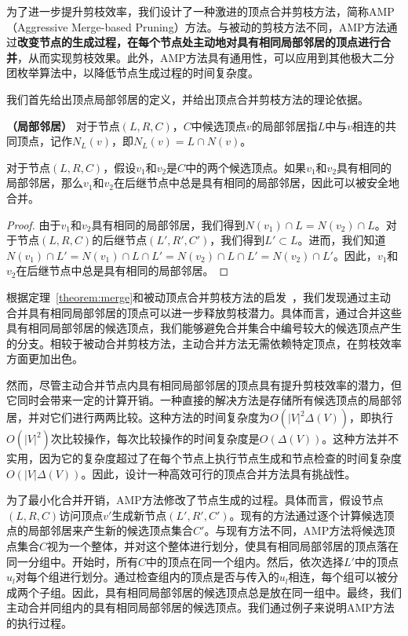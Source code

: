 为了进一步提升剪枝效率，我们设计了一种激进的顶点合并剪枝方法，简称AMP （Aggressive Merge-based Pruning）方法。与被动的剪枝方法不同，AMP方法通过\textbf{改变节点的生成过程，在每个节点处主动地对具有相同局部邻居的顶点进行合并}，从而实现剪枝效果。此外，AMP方法具有通用性，可以应用到其他极大二分团枚举算法中，以降低节点生成过程的时间复杂度。

我们首先给出顶点局部邻居的定义，并给出顶点合并剪枝方法的理论依据。

\begin{definition}
  \textbf{（局部邻居）} 对于节点$(L,R,C)$，$C$中候选顶点$v$的局部邻居指$L$中与$v$相连的共同顶点，记作$N_L(v)$，即$N_L(v) = L \cap N(v)$。
\end{definition}

\begin{theorem}
  对于节点$(L,R,C)$，假设$v_1$和$v_2$是$C$中的两个候选顶点。如果$v_1$和$v_2$具有相同的局部邻居，那么$v_1$和$v_2$在后继节点中总是具有相同的局部邻居，因此可以被安全地合并。
  \label{theorem:merge}
\end{theorem}

\begin{proof}
  由于$v_1$和$v_2$具有相同的局部邻居，我们得到$N(v_1)\cap L = N(v_2)\cap L$。对于节点$(L,R,C)$的后继节点$(L',R',C')$，我们得到$L' \subset L$。进而，我们知道$N(v_1)\cap L' = N(v_1) \cap L \cap L' = N(v_2) \cap L \cap L' = N(v_2)\cap L'$。因此，$v_1$和$v_2$在后继节点中总是具有相同的局部邻居。
\end{proof}


根据定理~\ref{theorem:merge}和被动顶点合并剪枝方法的启发~\cite{iMBEA14}，我们发现通过主动合并具有相同局部邻居的顶点可以进一步释放剪枝潜力。具体而言，通过合并这些具有相同局部邻居的候选顶点，我们能够避免合并集合中编号较大的候选顶点产生的分支。相较于被动合并剪枝方法，主动合并方法无需依赖特定顶点，在剪枝效率方面更加出色。

然而，尽管主动合并节点内具有相同局部邻居的顶点具有提升剪枝效率的潜力，但它同时会带来一定的计算开销。一种直接的解决方法是存储所有候选顶点的局部邻居，并对它们进行两两比较。这种方法的时间复杂度为$O(|V|^2\Delta(V))$，即执行$O(|V|^2)$次比较操作，每次比较操作的时间复杂度是$O(\Delta(V))$。这种方法并不实用，因为它的复杂度超过了在每个节点上执行节点生成和节点检查的时间复杂度$O(|V|\Delta(V))$。因此，设计一种高效可行的顶点合并方法具有挑战性。

为了最小化合并开销，AMP方法修改了节点生成的过程。具体而言，假设节点$(L,R,C)$访问顶点$v'$生成新节点$(L',R',C')$。现有的方法通过逐个计算候选顶点的局部邻居来产生新的候选顶点集合$C'$。与现有方法不同，AMP方法将候选顶点集合$C$视为一个整体，并对这个整体进行划分，使具有相同局部邻居的顶点落在同一分组中。开始时，所有$C$中的顶点在同一个组内。然后，依次选择$L'$中的顶点$u_l$对每个组进行划分。通过检查组内的顶点是否与传入的$u_l$相连，每个组可以被分成两个子组。因此，具有相同局部邻居的候选顶点总是放在同一组中。最终，我们主动合并同组内的具有相同局部邻居的候选顶点。我们通过例子来说明AMP方法的执行过程。


